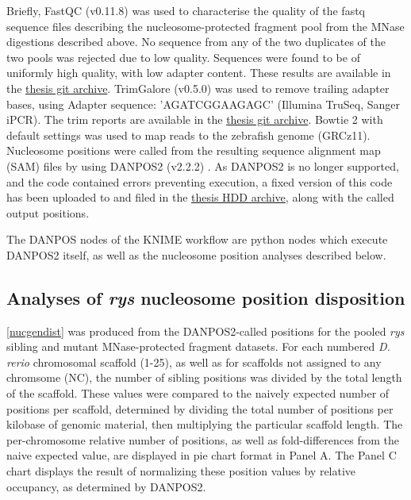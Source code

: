 Briefly, FastQC (v0.11.8) \cite{Andrews2018} was used to characterise the quality of the fastq sequence files describing the nucleosome-protected fragment pool from the MNase digestions described above. No sequence from any of the two duplicates of the two pools was rejected due to low quality. Sequences were found to be of uniformly high quality, with low adapter content. These results are available in the  \hyperref[sec:archive]{thesis git archive}. TrimGalore (v0.5.0) \cite{Andrews2018a} was used to remove trailing adapter bases, using Adapter sequence: 'AGATCGGAAGAGC' (Illumina TruSeq, Sanger iPCR). The trim reports are available in the \hyperref[sec:archive]{thesis git archive}.  Bowtie 2 \cite{Langmead2012} with default settings was used to map reads to the zebrafish genome (GRCz11). Nucleosome positions were called from the resulting sequence alignment map (SAM) files by using DANPOS2 (v2.2.2) \cite{Chen2013}. As DANPOS2 is no longer supported, and the code contained errors preventing execution, a fixed version of this code has been uploaded to  and filed in the \hyperref[sec:archive]{thesis HDD archive}, along with the called output positions.

The DANPOS nodes of the KNIME workflow are python nodes which execute DANPOS2 itself, as well as the nucleosome position analyses described below. 

\subsection{Analyses of \textit{rys} nucleosome position disposition}
\label{ssec:rysnucpos}
\autoref{nucgendist} was produced from the DANPOS2-called positions for the pooled \textit{rys} sibling and mutant MNase-protected fragment datasets. For each numbered \textit{D. rerio} chromosomal scaffold (1-25), as well as for scaffolds not assigned to any chromsome (NC), the number of sibling positions was divided by the total length of the scaffold. These values were compared to the naively expected number of positions per scaffold, determined by dividing the total number of positions per kilobase of genomic material, then multiplying the particular scaffold length. The per-chromosome relative number of positions, as well as fold-differences from the naive expected value, are displayed in pie chart format in Panel A. The Panel C chart displays the result of normalizing these position values by relative occupancy, as determined by DANPOS2. 

